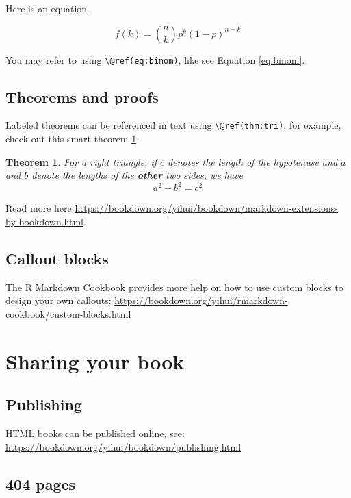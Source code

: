 \documentclass[
]{book}
\newtheorem{theorem}{Theorem}[chapter]
\theoremstyle{definition}
\theoremstyle{definition}
\theoremstyle{definition}
\theoremstyle{definition}
\theoremstyle{remark}
\begin{document}
Here is an equation.

\begin{equation} 
  f\left(k\right) = \binom{n}{k} p^k\left(1-p\right)^{n-k}
  \label{eq:binom}
\end{equation}

You may refer to using \texttt{\textbackslash{}@ref(eq:binom)}, like see Equation \eqref{eq:binom}.

\section{Theorems and proofs}\label{theorems-and-proofs}

Labeled theorems can be referenced in text using \texttt{\textbackslash{}@ref(thm:tri)}, for example, check out this smart theorem \ref{thm:tri}.

\begin{theorem}
\protect\hypertarget{thm:tri}{}\label{thm:tri}For a right triangle, if \(c\) denotes the \emph{length} of the hypotenuse
and \(a\) and \(b\) denote the lengths of the \textbf{other} two sides, we have
\[a^2 + b^2 = c^2\]
\end{theorem}

Read more here \url{https://bookdown.org/yihui/bookdown/markdown-extensions-by-bookdown.html}.

\section{Callout blocks}\label{callout-blocks}

The R Markdown Cookbook provides more help on how to use custom blocks to design your own callouts: \url{https://bookdown.org/yihui/rmarkdown-cookbook/custom-blocks.html}

\chapter{Sharing your book}\label{sharing-your-book}

\section{Publishing}\label{publishing}

HTML books can be published online, see: \url{https://bookdown.org/yihui/bookdown/publishing.html}

\section{404 pages}\label{pages}
\end{document}
